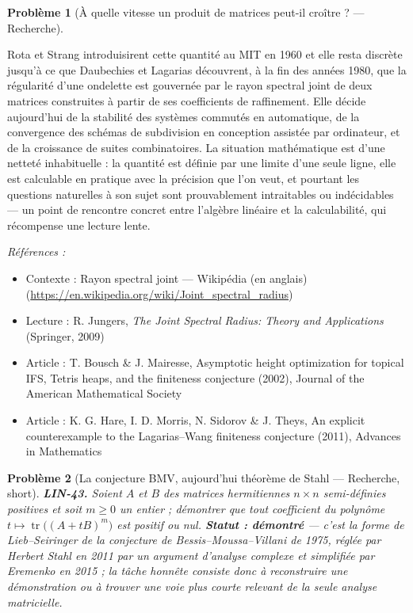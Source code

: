 \documentclass[11pt]{article}
\newtheorem{problem}{Problème}
\newenvironment{refs}{\par\small\noindent\emph{Références :}\begin{itemize}\setlength\itemsep{0pt}}{\end{itemize}\normalsize}
\begin{document}
\begin{problem}[{À quelle vitesse un produit de matrices peut-il croître ? --- Recherche}]
\end{problem}

\noindent Rota et Strang introduisirent cette quantité au MIT en 1960 et elle resta discrète
jusqu'à ce que Daubechies et Lagarias découvrent, à la fin des années 1980, que la régularité d'une
ondelette est gouvernée par le rayon spectral joint de deux matrices construites à partir de ses
coefficients de raffinement. Elle décide aujourd'hui de la stabilité des systèmes commutés en
automatique, de la convergence des schémas de subdivision en conception assistée par ordinateur, et de
la croissance de suites combinatoires. La situation mathématique est d'une netteté inhabituelle : la
quantité est définie par une limite d'une seule ligne, elle est calculable en pratique avec la
précision que l'on veut, et pourtant les questions naturelles à son sujet sont prouvablement
intraitables ou indécidables --- un point de rencontre concret entre l'algèbre linéaire et la
calculabilité, qui récompense une lecture lente.

\begin{refs}
\item Contexte : Rayon spectral joint --- Wikipédia (en anglais) (\url{https://en.wikipedia.org/wiki/Joint_spectral_radius})
\item Lecture : R. Jungers, \textit{The Joint Spectral Radius: Theory and Applications} (Springer, 2009)
\item Article : T. Bousch \& J. Mairesse, \og{} Asymptotic height optimization for topical IFS, Tetris heaps, and the finiteness conjecture \fg{} (2002), Journal of the American Mathematical Society
\item Article : K. G. Hare, I. D. Morris, N. Sidorov \& J. Theys, \og{} An explicit counterexample to the Lagarias--Wang finiteness conjecture \fg{} (2011), Advances in Mathematics
\end{refs}

\bigskip

\begin{problem}[{La conjecture BMV, aujourd'hui théorème de Stahl --- Recherche, short}]
\textbf{LIN-43.} Soient $A$ et $B$ des matrices hermitiennes
$n \times n$ semi-définies positives et soit $m \ge 0$ un entier ; démontrer que tout coefficient
du polynôme $t \mapsto \operatorname{tr}\big((A + tB)^{m}\big)$ est positif ou nul.
\textbf{Statut : démontré} --- c'est la forme de Lieb--Seiringer de la conjecture de
Bessis--Moussa--Villani de 1975, réglée par Herbert Stahl en 2011 par un argument d'analyse complexe et
simplifiée par Eremenko en 2015 ; la tâche honnête consiste donc à reconstruire une démonstration ou à
trouver une voie plus courte relevant de la seule analyse matricielle.
\end{problem}
\end{document}
